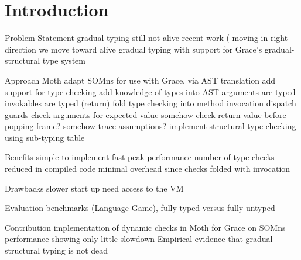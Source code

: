 \section{Introduction}
\label{sec:introduction}

\begin{outline}

\1 Problem Statement
    \2 gradual typing still not alive
    \2 recent work (\cite{Richards2017,Greenman2017} moving in right direction
    \2 we move toward alive gradual typing with support for Grace's gradual-structural type system

\1 Approach
    \2 Moth
        \3 adapt SOMns for use with Grace, via AST translation
        \3 add support for type checking
    \2 add knowledge of types into AST
        \3 arguments are typed
        \3 invokables are typed (return)
    \2 fold type checking into method invocation
        \3 dispatch guards check arguments for expected value
        \3 somehow check return value before popping frame?
        \3 somehow trace assumptions?
    \2 implement structural type checking using sub-typing table

\1 Benefits
    \2 simple to implement
    \2 fast peak performance
        \3 number of type checks reduced in compiled code
        \3 minimal overhead since checks folded with invocation

\1 Drawbacks
    \2 slower start up
    \2 need access to the VM
    

\1 Evaluation
    \2 benchmarks (Language Game), fully typed versus fully untyped

\1 Contribution
    \2 implementation of dynamic checks in Moth for Grace on SOMns
    \2 performance showing only little slowdown
    \2 Empirical evidence that gradual-structural typing is not dead

\end{outline}


